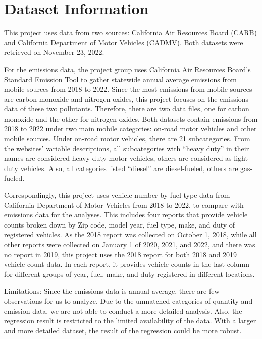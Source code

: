 \documentclass[
  12pt,
]{article}
\begin{document}
\newpage

\hypertarget{dataset-information}{%
\section{Dataset Information}\label{dataset-information}}

This project uses data from two sources: California Air Resources Board
(CARB) and California Department of Motor Vehicles (CADMV). Both
datasets were retrieved on November 23, 2022.

For the emissions data, the project group uses California Air Resources
Board's Standard Emission Tool to gather statewide annual average
emissions from mobile sources from 2018 to 2022. Since the most
emissions from mobile sources are carbon monoxide and nitrogen oxides,
this project focuses on the emissions data of these two pollutants.
Therefore, there are two data files, one for carbon monoxide and the
other for nitrogen oxides. Both datasets contain emissions from 2018 to
2022 under two main mobile categories: on-road motor vehicles and other
mobile sources. Under on-road motor vehicles, there are 21
subcategories. From the websites' variable descriptions, all
subcategories with ``heavy duty'' in their names are considered heavy
duty motor vehicles, others are considered as light duty vehicles. Also,
all categories listed ``diesel'' are diesel-fueled, others are
gas-fueled.

Correspondingly, this project uses vehicle number by fuel type data from
California Department of Motor Vehicles from 2018 to 2022, to compare
with emissions data for the analyses. This includes four reports that
provide vehicle counts broken down by Zip code, model year, fuel type,
make, and duty of registered vehicles. As the 2018 report was collected
on October 1, 2018, while all other reports were collected on January 1
of 2020, 2021, and 2022, and there was no report in 2019, this project
uses the 2018 report for both 2018 and 2019 vehicle count data. In each
report, it provides vehicle counts in the last column for different
groups of year, fuel, make, and duty registered in different locations.

Limitations: Since the emissions data is annual average, there are few
observations for us to analyze. Due to the unmatched categories of
quantity and emission data, we are not able to conduct a more detailed
analysis. Also, the regression result is restricted to the limited
availability of the data. With a larger and more detailed dataset, the
result of the regression could be more robust.
\end{document}
